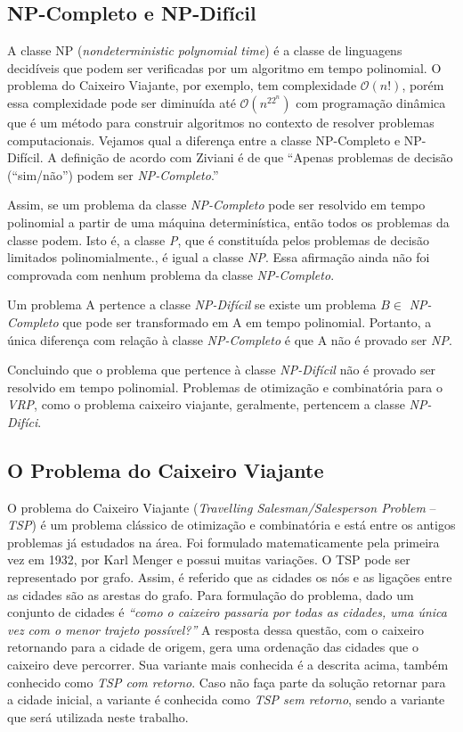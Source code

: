 \subsection{NP-Completo e NP-Difícil} \label{classes-np}
A classe NP (\emph{nondeterministic polynomial time}) é a classe de linguagens decidíveis que podem ser verificadas por um algoritmo em tempo polinomial. O problema do Caixeiro Viajante, por exemplo, tem complexidade $\mathcal{O}(n!)$, porém essa complexidade pode ser diminuída até  $\mathcal{O}(n^22^n)$ \cite[p. 405]{ziviani} com programação dinâmica que é um método para construir algoritmos no contexto de resolver problemas computacionais. Vejamos qual a diferença entre a classe NP-Completo e NP-Difícil. A definição de acordo com Ziviani é de que ``Apenas problemas de decisão (“sim/não”) podem ser \emph{NP-Completo}.'' \cite[p. 415]{ziviani}

Assim, se um problema da classe \emph{NP-Completo} pode ser resolvido em tempo polinomial a partir de uma máquina determinística, então todos os problemas da classe podem. Isto é, a classe \emph{P}, que é constituída pelos problemas de decisão limitados polinomialmente., é igual a classe \emph{NP}. Essa afirmação ainda não foi comprovada com nenhum problema da classe \emph{NP-Completo}.

Um problema A pertence a classe \emph{NP-Difícil} se existe um problema $B \in $ \emph{NP-Completo} que pode ser transformado em A em tempo polinomial. Portanto, a única diferença com relação à classe \emph{NP-Completo} é que A não é provado ser \emph{NP}. \cite[p. 4]{bueno}

Concluindo que o problema que pertence à classe \emph{NP-Difícil} não é provado ser resolvido em tempo polinomial. Problemas de otimização e combinatória para o \emph{VRP}, como o problema caixeiro viajante,  geralmente, pertencem a classe \emph{NP-Difíci}.

\subsection{O Problema do Caixeiro Viajante}

O problema do Caixeiro Viajante (\emph{Travelling Salesman/Salesperson Problem} -- \emph{TSP}) é um problema clássico de otimização e combinatória e está entre os antigos problemas já estudados na área. Foi formulado matematicamente pela primeira vez em 1932, por Karl Menger \cite{oliveira2015extensoes} e possui muitas variações.
O TSP pode ser representado por grafo. Assim, é referido que as cidades os nós e as ligações entre as cidades são as arestas do grafo. Para formulação do problema, dado um conjunto de cidades é \emph{``como o caixeiro passaria por todas as cidades, uma única vez com o menor trajeto possível?''} A resposta dessa questão, com o caixeiro retornando para a cidade de origem, gera uma ordenação das cidades que o caixeiro deve percorrer. Sua variante mais conhecida é a descrita acima, também conhecido como \emph{TSP com retorno}. Caso não faça parte da solução retornar para a cidade inicial, a variante é conhecida como \emph{TSP sem retorno}, sendo a variante que será utilizada neste trabalho. 


